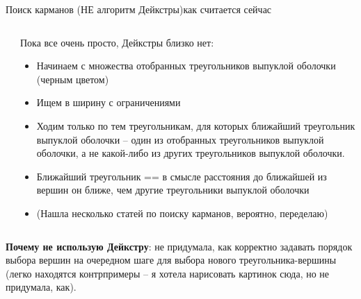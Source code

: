 \documentclass[10pt, xcolor={dvipsnames}]{beamer}
\begin{document}
\begin{frame}{Поиск карманов (НЕ алгоритм Дейкстры)}{как считается сейчас}
\begin{columns}
\begin{column}{0.1\textwidth}
\end{column}
\begin{column}{0.9\textwidth}
\small{
Пока все очень просто, Дейкстры близко нет:
\begin{itemize}
\item Начинаем с множества отобранных треугольников выпуклой оболочки (черным цветом)
\item Ищем в ширину с ограничениями
\item Ходим только по тем треугольникам, для которых ближайший треугольник выпуклой оболочки -- один из отобранных треугольников выпуклой оболочки, а не какой-либо из других треугольников выпуклой оболочки.
\item Ближайший треугольник == в смысле расстояния до ближайшей из вершин он ближе, чем другие треугольники выпуклой оболочки

\item (Нашла несколько статей по поиску карманов, вероятно, переделаю) 
\end{itemize}
}
\end{column}
\end{columns}


\textbf{Почему не использую Дейкстру}: не придумала, как корректно задавать порядок выбора вершин на очередном шаге для выбора нового треугольника-вершины (легко находятся контрпримеры -- я хотела нарисовать картинок сюда, но не придумала, как).
\end{frame}
\end{document}
